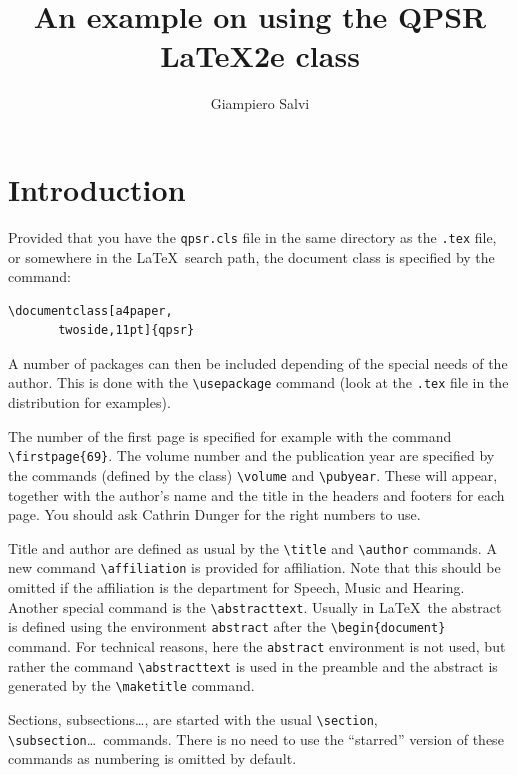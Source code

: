 \documentclass[a4paper,twoside,10pt]{fonetik}
\title{An example on using the QPSR \LaTeX2e class}
\author{Giampiero Salvi}
\affiliation{Here write the affiliation only if it is different from TMH}
\begin{document}
\maketitle


\section{Introduction}
Provided that you have the \verb|qpsr.cls| file in the same directory
as the \verb|.tex| file, or somewhere in the \LaTeX\ search path, the
document class is specified by the command:
\begin{verbatim}
\documentclass[a4paper,
       twoside,11pt]{qpsr}
\end{verbatim}

A number of packages can then be included depending of the special
needs of the author. This is done with the \verb|\usepackage| command
(look at the \verb|.tex| file in the distribution for examples).

The number of the first page is specified for example with the command
\verb|\firstpage{69}|. The volume number and the publication
year are specified by the commands (defined by the class)
\verb|\volume| and \verb|\pubyear|. These will appear, together with
the author's name and the title in the headers and footers for each
page. You should ask Cathrin Dunger for the right numbers to use. 

Title and author are defined as usual by the \verb|\title| and
\verb|\author| commands. A new command \verb|\affiliation| is provided
for affiliation. Note that this should be omitted if the affiliation
is the department for Speech, Music and Hearing. Another special
command is the \verb|\abstracttext|. Usually in \LaTeX\ the abstract
is defined using the environment \verb|abstract| after the
\verb|\begin{document}|
command. For technical reasons, here the
\verb|abstract| environment is not used, but rather the command
\verb|\abstracttext| is used in the preamble and the abstract is
generated by the \verb|\maketitle| command.

Sections, subsections\ldots, are started with the usual
\verb|\section|, \verb|\subsection|\ldots\ commands. There is no need
to use the ``starred'' version of these commands as numbering is
omitted by default.
\end{document}
